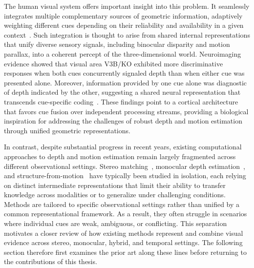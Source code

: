 The human visual system offers important insight into this problem.
It seamlessly integrates multiple complementary sources of geometric information, adaptively weighting different cues depending on their reliability and availability in a given context~\cite{ban2012integration}.
Such integration is thought to arise from shared internal representations that unify diverse sensory signals, including binocular disparity and motion parallax, into a coherent percept of the three-dimensional world.
Neuroimaging evidence showed that visual area V3B/KO exhibited more discriminative responses when both cues concurrently signaled depth than when either cue was presented alone.
Moreover, information provided by one cue alone was diagnostic of depth indicated by the other, suggesting a shared neural representation that transcends cue-specific coding~\cite{ban2012integration}.
These findings point to a cortical architecture that favors cue fusion over independent processing streams, providing a biological inspiration for addressing the challenges of robust depth and motion estimation through unified geometric representations.

In contrast, despite substantial progress in recent years, existing computational approaches to depth and motion estimation remain largely fragmented across different observational settings.
Stereo matching~\cite{scharstein2002taxonomy,hirschmuller2005accurate}, monocular depth estimation~\cite{eigen2014depth,Ranftl2022}, and structure-from-motion~\cite{schoenberger2016sfm,pan2024glomap} have typically been studied in isolation, each relying on distinct intermediate representations that limit their ability to transfer knowledge across modalities or to generalize under challenging conditions.
Methods are tailored to specific observational settings rather than unified by a common representational framework.
As a result, they often struggle in scenarios where individual cues are weak, ambiguous, or conflicting.
This separation motivates a closer review of how existing methods represent and combine visual evidence across stereo, monocular, hybrid, and temporal settings.
The following section therefore first examines the prior art along these lines before returning to the contributions of this thesis.


